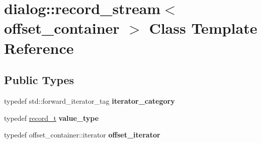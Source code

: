 \hypertarget{classdialog_1_1record__stream}{}\section{dialog\+:\+:record\+\_\+stream$<$ offset\+\_\+container $>$ Class Template Reference}
\label{classdialog_1_1record__stream}
\subsection*{Public Types}
\begin{DoxyCompactItemize}
\item 
\mbox{\label{classdialog_1_1record__stream_ad2e87f19c47fed1ab24f95c374621d55}} 
typedef std\+::forward\+\_\+iterator\+\_\+tag {\bfseries iterator\+\_\+category}
\item 
\mbox{\label{classdialog_1_1record__stream_a42dbf21e91ba40e6532a95d7015be1eb}} 
typedef \hyperlink{structdialog_1_1record__t}{record\+\_\+t} {\bfseries value\+\_\+type}
\item 
\mbox{\label{classdialog_1_1record__stream_af5467b1ca78962cebe23ea9c78a5d32d}} 
typedef offset\+\_\+container\+::iterator {\bfseries offset\+\_\+iterator}
\end{DoxyCompactItemize}

